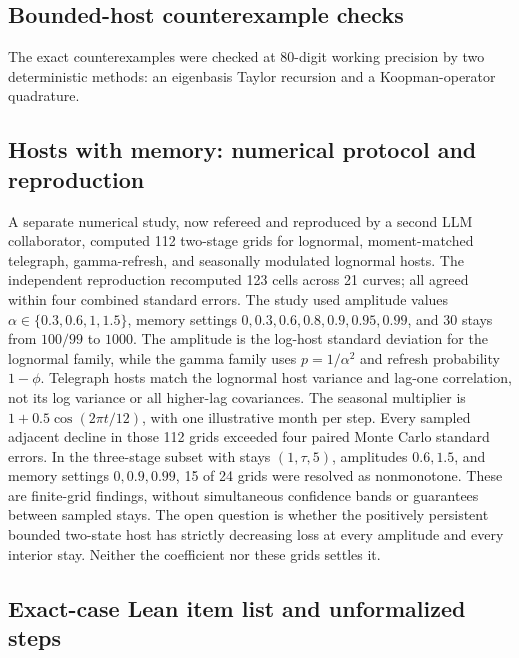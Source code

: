 \subsection{Bounded-host counterexample checks}\label{esm:exact-counterexample-checks}

The exact counterexamples were checked at 80-digit working precision by two deterministic methods: an eigenbasis Taylor recursion and a Koopman-operator quadrature.

\subsection{Hosts with memory: numerical protocol and reproduction}\label{esm:exact-memory-numerics}

A separate numerical study, now refereed and reproduced by a second LLM collaborator, computed 112 two-stage grids for lognormal, moment-matched telegraph, gamma-refresh, and seasonally modulated lognormal hosts. The independent reproduction recomputed 123 cells across 21 curves; all agreed within four combined standard errors. The study used amplitude values $\alpha\in\{0.3,0.6,1,1.5\}$, memory settings $0,0.3,0.6,0.8,0.9,0.95,0.99$, and 30 stays from $100/99$ to $1000$. The amplitude is the log-host standard deviation for the lognormal family, while the gamma family uses $p=1/\alpha^2$ and refresh probability $1-\phi$. Telegraph hosts match the lognormal host variance and lag-one correlation, not its log variance or all higher-lag covariances. The seasonal multiplier is $1+0.5\cos(2\pi t/12)$, with one illustrative month per step. Every sampled adjacent decline in those 112 grids exceeded four paired Monte Carlo standard errors. In the three-stage subset with stays $(1,\tau,5)$, amplitudes $0.6,1.5$, and memory settings $0,0.9,0.99$, 15 of 24 grids were resolved as nonmonotone. These are finite-grid findings, without simultaneous confidence bands or guarantees between sampled stays. The open question is whether the positively persistent bounded two-state host has strictly decreasing loss at every amplitude and every interior stay. Neither the coefficient nor these grids settles it.

\subsection{Exact-case Lean item list and unformalized steps}\label{esm:exact-lean}

